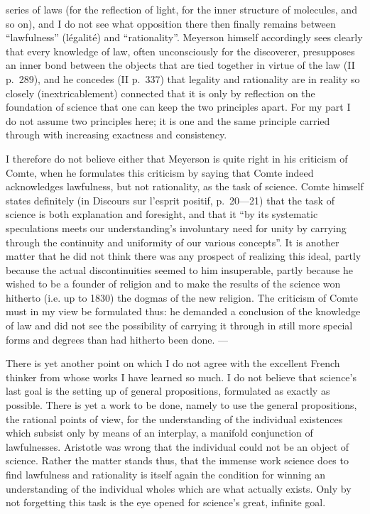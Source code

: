 \documentclass[12pt]{article}
\newcommand{\opage}[1]{\marginnote{\footnotesize\textit{[#1]}}}
\begin{document}
series of laws (for the reflection of light, for the inner structure of
molecules, and so on), and I do not see what opposition there then finally
remains between ``lawfulness'' (légalité) and ``rationality''. Meyerson
himself accordingly sees clearly that every knowledge of law, often
unconsciously for the discoverer, presupposes an inner bond between the
objects that are tied together in virtue of the law (II p.~289), and he
concedes (II p.~337) that legality and rationality are in reality so closely
(inextricablement) connected that it is only by reflection on the foundation
of science that one can keep the two principles apart. For my part I do not
assume two principles here; it is one and the same principle carried through
with increasing exactness and consistency.

I therefore do not believe either that Meyerson is quite right in his
criticism of Comte, when he formulates this criticism by saying that Comte
indeed acknowledges lawfulness, but not rationality, as the task of science.
Comte himself states definitely (in Discours sur l'esprit positif,
p.~20---21) that the task of science is both explanation and foresight, and
that it ``by its systematic speculations meets our understanding's
involuntary need for unity by carrying through the continuity and uniformity
of our various concepts''. It is another matter that he did not think there
was any \opage{55}prospect of realizing this ideal, partly because the actual
discontinuities seemed to him insuperable, partly because he wished to be a
founder of religion and to make the results of the science won hitherto
(i.e. up to 1830) the dogmas of the new religion. The criticism of Comte
must in my view be formulated thus: he demanded a conclusion of the
knowledge of law and did not see the possibility of carrying it through in
still more special forms and degrees than had hitherto been done. ---

There is yet another point on which I do not agree with the excellent French
thinker from whose works I have learned so much. I do not believe that
science's last goal is the setting up of general propositions, formulated as
exactly as possible. There is yet a work to be done, namely to use the
general propositions, the rational points of view, for the understanding of
the individual existences which subsist only by means of an interplay, a
manifold conjunction of lawfulnesses. Aristotle was wrong that the
individual could not be an object of science. Rather the matter stands thus,
that the immense work science does to find lawfulness and rationality is
itself again the condition for winning an understanding of the individual
wholes which are what actually exists. Only by not forgetting this task is
the eye opened for science's great, infinite goal.
\end{document}

